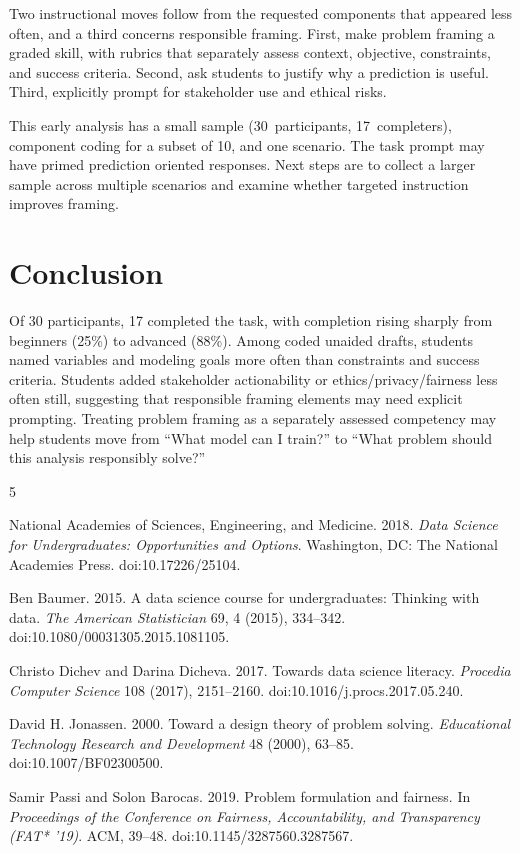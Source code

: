 \documentclass[sigconf,screen,anonymous]{acmart}
\begin{document}
Two instructional moves follow from the requested components that appeared less often, and a third concerns responsible framing. First, make problem framing a graded skill, with rubrics that separately assess context, objective, constraints, and success criteria. Second, ask students to justify why a prediction is useful. Third, explicitly prompt for stakeholder use and ethical risks.

This early analysis has a small sample (30~participants, 17~completers), component coding for a subset of 10, and one scenario. The task prompt may have primed prediction oriented responses. Next steps are to collect a larger sample across multiple scenarios and examine whether targeted instruction improves framing.

\section{Conclusion}
Of 30 participants, 17 completed the task, with completion rising sharply from beginners (25\%) to advanced (88\%). Among coded unaided drafts, students named variables and modeling goals more often than constraints and success criteria. Students added stakeholder actionability or ethics/privacy/fairness less often still, suggesting that responsible framing elements may need explicit prompting. Treating problem framing as a separately assessed competency may help students move from ``What model can I train?'' to ``What problem should this analysis responsibly solve?''

\balance
{\scriptsize
\begin{thebibliography}{5}
\setlength{\itemsep}{0pt}
\setlength{\parskip}{0pt}

National Academies of Sciences, Engineering, and Medicine. 2018.
\emph{Data Science for Undergraduates: Opportunities and Options}.
Washington, DC: The National Academies Press. doi:10.17226/25104.

Ben Baumer. 2015. A data science course for undergraduates: Thinking with data.
\emph{The American Statistician} 69, 4 (2015), 334--342. doi:10.1080/00031305.2015.1081105.

Christo Dichev and Darina Dicheva. 2017. Towards data science literacy.
\emph{Procedia Computer Science} 108 (2017), 2151--2160.
doi:10.1016/j.procs.2017.05.240.

David H. Jonassen. 2000. Toward a design theory of problem solving.
\emph{Educational Technology Research and Development} 48 (2000), 63--85.
doi:10.1007/BF02300500.

Samir Passi and Solon Barocas. 2019. Problem formulation and fairness.
In \emph{Proceedings of the Conference on Fairness, Accountability, and Transparency (FAT* '19)}.
ACM, 39--48. doi:10.1145/3287560.3287567.

\end{thebibliography}
}
\end{document}
